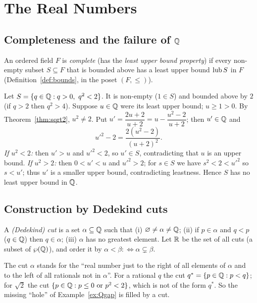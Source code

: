\chapter{The Real Numbers}\label{ch:reals}

\section{Completeness and the failure of $\mathbb{Q}$}

\begin{definition}
	An ordered field $F$ is \emph{complete} (has the \emph{least upper bound property}) if every non-empty subset $S\subseteq F$ that is bounded above has a least upper bound $\operatorname{lub} S$ in $F$ (Definition~\ref{def:bounds}, in the poset $(F,\le)$).
\end{definition}

\begin{example}\label{ex:Qgap}
	Let $S=\{q\in\mathbb{Q}:q>0,\ q^2<2\}$. It is non-empty ($1\in S$) and bounded above by $2$ (if $q>2$ then $q^2>4$). Suppose $u\in\mathbb{Q}$ were its least upper bound; $u\ge1>0$. By Theorem~\ref{thm:sqrt2}, $u^2\neq2$. Put $u'=\dfrac{2u+2}{u+2}=u-\dfrac{u^2-2}{u+2}$; then $u'\in\mathbb{Q}$ and
	\[
	u'^2-2=\frac{2(u^2-2)}{(u+2)^2}.
	\]
	\emph{If $u^2<2$:} then $u'>u$ and $u'^2<2$, so $u'\in S$, contradicting that $u$ is an upper bound. \emph{If $u^2>2$:} then $0<u'<u$ and $u'^2>2$; for $s\in S$ we have $s^2<2<u'^2$ so $s<u'$; thus $u'$ is a smaller upper bound, contradicting leastness. Hence $S$ has no least upper bound in $\mathbb{Q}$.
\end{example}

\section{Construction by Dedekind cuts}

\begin{definition}[Cut]
	A \emph{(Dedekind) cut} is a set $\alpha\subseteq\mathbb{Q}$ such that (i) $\varnothing\neq\alpha\neq\mathbb{Q}$; (ii) if $p\in\alpha$ and $q<p$ ($q\in\mathbb{Q}$) then $q\in\alpha$; (iii) $\alpha$ has no greatest element. Let $\mathbb{R}$ be the set of all cuts (a subset of $\wp(\mathbb{Q})$), and order it by $\alpha<\beta:\iff\alpha\subsetneq\beta$.
\end{definition}

\begin{intuition}
	The cut $\alpha$ stands for the ``real number just to the right of all elements of $\alpha$ and to the left of all rationals not in $\alpha$''. For a rational $q$ the cut $q^*=\{p\in\mathbb{Q}:p<q\}$; for $\sqrt2$ the cut $\{p\in\mathbb{Q}:p\le0\text{ or }p^2<2\}$, which is not of the form $q^*$. So the missing ``hole'' of Example~\ref{ex:Qgap} is filled by a cut.
\end{intuition}

